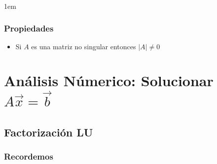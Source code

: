 \documentclass[12pt, fleqn]{report}                             %
\newenvironment{SmallIndentation}[1][0.75em]                    %
        {\begin{adjustwidth}{#1}{}\begin{footnotesize}}             %
        {\end{footnotesize}\end{adjustwidth}}                       %
\theoremstyle{break}                                            %
\begin{document}
\begin{itemize}
\begin{SmallIndentation}[1em]
\begin{itemize}
                            \end{itemize}
                        
                        \end{SmallIndentation}

                \end{itemize}

                       
        \clearpage
        \section{Propiedades}

            \begin{itemize}
                \item Si $A$ es una matriz no singular entonces $|A| \neq 0$
            \end{itemize}
  

                    

\part{Análisis Númerico: Solucionar $A \vec x = \vec b$}

    \chapter{Factorización LU}

        \clearpage
        \section{Recordemos}
\end{document}
